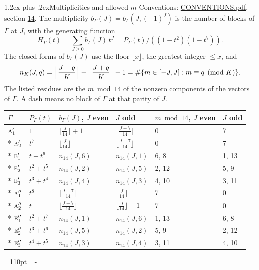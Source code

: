 \documentclass[10pt,a4paper]{article}
\makeatletter
\renewcommand\section{\@startsection{section}{1}{\z@}{-3ex plus -1ex minus -.2ex}%
  {1.2ex plus .2ex}{\normalfont\large\sffamily\bfseries\color{parttitle}}}
\newcommand{\needspace}[1]{\par\penalty-100\begingroup\dimen0=#1\relax\dimen2=\pagegoal
  \advance\dimen2-\pagetotal\ifdim\dimen0>\dimen2\relax\ifdim\dimen2>0pt\vfil\break\fi\fi
  \endgroup}
\numberwithin{equation}{section}
\newcommand{\irr}[1]{\text{\normalfont\scshape #1}}
\makeatother
\begin{document}
\section{Multiplicities and allowed \texorpdfstring{$m$}{m}}\label{s:multiplicities}
Conventions: \href{../../CONVENTIONS.pdf}{CONVENTIONS.pdf}, section \href{../../CONVENTIONS.pdf\#conv.14}{14}.
\leavevmode\label{n:function.generating}\label{n:index.generating.variable}\label{n:function.generating.numerator}The multiplicity $b_\Gamma(J) = b_\Gamma(J, (-1)^J)$ is the number of blocks of $\Gamma$ at $J$, with the generating function
\begin{equation}\label{e:gf}H_\Gamma(t) = \sum_{J\ge0} b_\Gamma(J)\,t^J = P_\Gamma(t)/((1-t^{2})(1-t^{7})).\end{equation}
\leavevmode\label{n:delimiter.floor}\label{n:local.floor.x}\label{n:function.count}\label{n:index.modulus.K}\label{n:index.residue}The closed forms of $b_\Gamma(J)$ use the floor $\lfloor x\rfloor$, the greatest integer $\le x$, and
\begin{equation}\label{e:count}n_K(J,q) = \Bigl\lfloor\frac{J-q}{K}\Bigr\rfloor + \Bigl\lfloor\frac{J+q}{K}\Bigr\rfloor + 1 = \#\{m\in[-J,J] : m\equiv q \pmod{K}\}.\end{equation}
\leavevmode\label{n:head.parity}The listed residues are the $m \bmod 14$ of the nonzero components of the vectors of $\Gamma$. A dash means no block of $\Gamma$ at that parity of $J$.
{\small{\renewcommand{\arraystretch}{1.3}\begin{longtable}{@{}llllll@{}}\toprule
$\Gamma$ & $P_\Gamma(t)$ & $b_\Gamma(J)$, $J$ even & $J$ odd & $m \bmod 14$, $J$ even & $J$ odd\\\midrule\endhead
\bottomrule\endfoot\endlastfoot
$\irr{a}_{1}'$ & $1$ & $\bigl\lfloor\tfrac{J}{14}\bigr\rfloor + 1$ & $\bigl\lfloor\tfrac{J+7}{14}\bigr\rfloor$ & 0 & 7\\*
$\irr{a}_{2}'$ & $t^{7}$ & $\bigl\lfloor\tfrac{J}{14}\bigr\rfloor$ & $\bigl\lfloor\tfrac{J+7}{14}\bigr\rfloor$ & 0 & 7\\*
$\irr{e}_{1}'$ & $t + t^{6}$ & $n_{14}(J,6)$ & $n_{14}(J,1)$ & 6, 8 & 1, 13\\*
$\irr{e}_{2}'$ & $t^{2} + t^{5}$ & $n_{14}(J,2)$ & $n_{14}(J,5)$ & 2, 12 & 5, 9\\*
$\irr{e}_{3}'$ & $t^{3} + t^{4}$ & $n_{14}(J,4)$ & $n_{14}(J,3)$ & 4, 10 & 3, 11\\*
$\irr{a}_{1}''$ & $t^{8}$ & $\bigl\lfloor\tfrac{J+7}{14}\bigr\rfloor$ & $\bigl\lfloor\tfrac{J}{14}\bigr\rfloor$ & 7 & 0\\*
$\irr{a}_{2}''$ & $t$ & $\bigl\lfloor\tfrac{J+7}{14}\bigr\rfloor$ & $\bigl\lfloor\tfrac{J}{14}\bigr\rfloor + 1$ & 7 & 0\\*
$\irr{e}_{1}''$ & $t^{2} + t^{7}$ & $n_{14}(J,1)$ & $n_{14}(J,6)$ & 1, 13 & 6, 8\\*
$\irr{e}_{2}''$ & $t^{3} + t^{6}$ & $n_{14}(J,5)$ & $n_{14}(J,2)$ & 5, 9 & 2, 12\\*
$\irr{e}_{3}''$ & $t^{4} + t^{5}$ & $n_{14}(J,3)$ & $n_{14}(J,4)$ & 3, 11 & 4, 10\\
\bottomrule\end{longtable}}}
\needspace{110pt}
\end{document}
